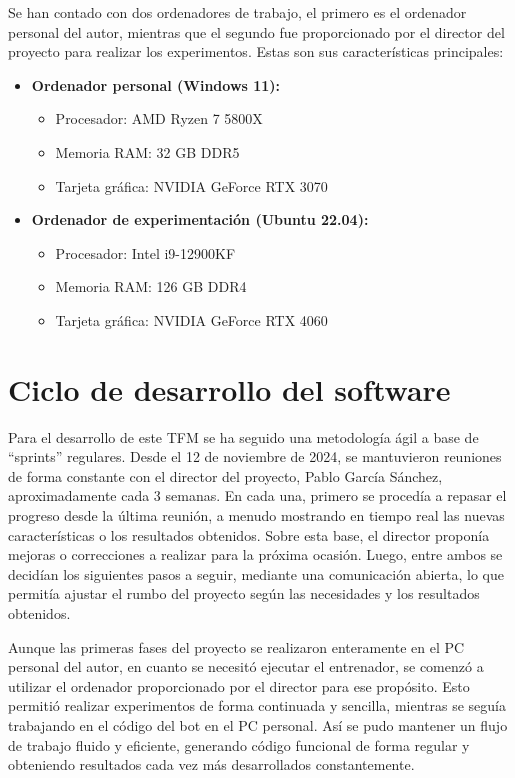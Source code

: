 Se han contado con dos ordenadores de trabajo, el primero es el ordenador personal del autor, mientras que el segundo fue proporcionado por el director del proyecto para realizar los experimentos. Estas son sus características principales:

\begin{itemize}
	\item \textbf{Ordenador personal (Windows 11):}
	      \begin{itemize}
		      \item Procesador: AMD Ryzen 7 5800X
		      \item Memoria RAM: 32 GB DDR5
		      \item Tarjeta gráfica: NVIDIA GeForce RTX 3070
	      \end{itemize}
	\item \textbf{Ordenador de experimentación (Ubuntu 22.04):}
	      \begin{itemize}
		      \item Procesador: Intel i9-12900KF
		      \item Memoria RAM: 126 GB DDR4
		      \item Tarjeta gráfica: NVIDIA GeForce RTX 4060
	      \end{itemize}
\end{itemize}

\section{Ciclo de desarrollo del software} \label{sec:metodologia_desarrollo}

Para el desarrollo de este TFM se ha seguido una metodología ágil a base de ``sprints'' regulares. Desde el 12 de noviembre de 2024, se mantuvieron reuniones de forma constante con el director del proyecto, Pablo García Sánchez, aproximadamente cada 3 semanas. En cada una, primero se procedía a repasar el progreso desde la última reunión, a menudo mostrando en tiempo real las nuevas características o los resultados obtenidos. Sobre esta base, el director proponía mejoras o correcciones a realizar para la próxima ocasión. Luego, entre ambos se decidían los siguientes pasos a seguir, mediante una comunicación abierta, lo que permitía ajustar el rumbo del proyecto según las necesidades y los resultados obtenidos.

Aunque las primeras fases del proyecto se realizaron enteramente en el PC personal del autor, en cuanto se necesitó ejecutar el entrenador, se comenzó a utilizar el ordenador proporcionado por el director para ese propósito. Esto permitió realizar experimentos de forma continuada y sencilla, mientras se seguía trabajando en el código del bot en el PC personal. Así se pudo mantener un flujo de trabajo fluido y eficiente, generando código funcional de forma regular y obteniendo resultados cada vez más desarrollados constantemente.


